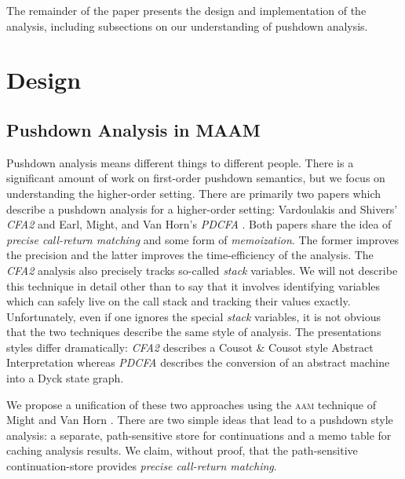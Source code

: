 \documentclass[10pt,letter,english]{article}
\newcommand{\aam}[0]{\textsc{aam}}
\begin{document}
The remainder of the paper presents the design and implementation of the
analysis, including subsections on our understanding of pushdown analysis.

\section{Design}
\subsection{Pushdown Analysis in MAAM}

Pushdown analysis means different things to different people. There is a
significant amount of work on first-order pushdown semantics, but we focus on
understanding the higher-order setting. There are primarily two papers which
describe a pushdown analysis for a higher-order setting: Vardoulakis and
Shivers' \emph{CFA2} \cite{cfa2} and Earl, Might, and Van Horn's \emph{PDCFA}
\cite{pdcfa}. Both papers share the idea of \emph{precise call-return matching}
and some form of \emph{memoization}. The former improves the precision and the
latter improves the time-efficiency of the analysis. The \emph{CFA2} analysis
also precisely tracks so-called \emph{stack} variables. We will not describe
this technique in detail other than to say that it involves identifying
variables which can safely live on the call stack and tracking their values
exactly. Unfortunately, even if one ignores the special \emph{stack} variables,
it is not obvious that the two techniques describe the same style of
analysis. The presentations styles differ dramatically: \emph{CFA2} describes a
Cousot \& Cousot style Abstract Interpretation whereas \emph{PDCFA} describes
the conversion of an abstract machine into a Dyck state graph.

We propose a unification of these two approaches using the \aam{} technique of
Might and Van Horn \cite{aam}. There are two simple ideas that lead to a
pushdown style analysis: a separate, path-sensitive store for continuations and
a memo table for caching analysis results. We claim, without proof, that the
path-sensitive continuation-store provides \emph{precise call-return matching}.
\end{document}
